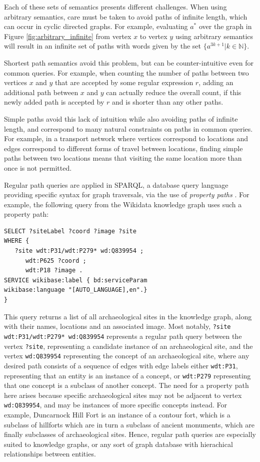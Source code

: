 \documentclass{article}
\begin{document}
Each of these sets of semantics presents different challenges. When using arbitrary semantics, care must be taken to avoid paths of infinite length, which can occur in cyclic directed graphs. For example, evaluating $a^*$ over the graph in Figure \ref{fig:arbitrary_infinite} from vertex $x$ to vertex $y$ using arbitrary semantics will result in an infinite set of paths with words given by the set $\{a^{3k+1} | k \in \mathbb{N}\}$.

Shortest path semantics avoid this problem, but can be counter-intuitive even for common queries. For example, when counting the number of paths between two vertices $x$ and $y$ that are accepted by some regular expression $r$, adding an additional path between $x$ and $y$ can actually reduce the overall count, if this newly added path is accepted by $r$ and is shorter than any other paths.

Simple paths avoid this lack of intuition while also avoiding paths of infinite length, and correspond to many natural constraints on paths in common queries. For example, in a transport network where vertices correspond to locations and edges correspond to different forms of travel between locations, finding simple paths between two locations means that visiting the same location more than once is not permitted.

Regular path queries are applied in SPARQL, a database query language providing specific syntax for graph traversals, via the use of \emph{property paths} \cite{SPARQLQueryLanguage}. For example, the following query from the Wikidata knowledge graph \cite{WikidataSPARQLQuery} uses such a property path:


\begin{lstlisting}[language=SPARQL]
SELECT ?siteLabel ?coord ?image ?site
WHERE {
   ?site wdt:P31/wdt:P279* wd:Q839954 ;
      wdt:P625 ?coord ;
      wdt:P18 ?image .
SERVICE wikibase:label { bd:serviceParam
wikibase:language "[AUTO_LANGUAGE],en".}
}
\end{lstlisting}

This query returns a list of all archaeological sites in the knowledge graph, along with their names, locations and an associated image. Most notably, \texttt{?site wdt:P31/wdt:P279* wd:Q839954} represents a regular path query between the vertex \texttt{?site}, representing a candidate instance of an archaeological site, and the vertex \texttt{wd:Q839954} representing the concept of an archaeological site, where any desired path consists of a sequence of edges with edge labels either \texttt{wdt:P31}, representing that an entity is an instance of a concept, or \texttt{wdt:P279} representing that one concept is a subclass of another concept. The need for a property path here arises because specific archaeological sites may not be adjacent to vertex \texttt{wd:Q839954}, and may be instances of more specific concepts instead. For example, Duncarnock Hill Fort is an instance of a contour fort, which is a subclass of hillforts which are in turn a subclass of ancient monuments, which are finally subclasses of archaeological sites. Hence, regular path queries are especially suited to knowledge graphs, or any sort of graph database with hierachical relationships between entities.
\end{document}
